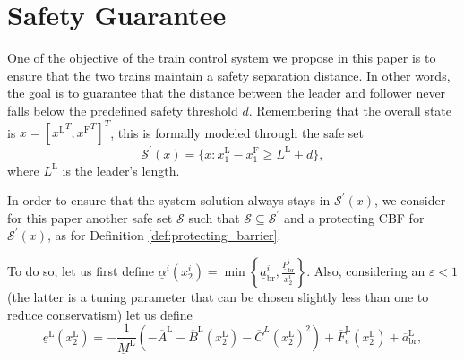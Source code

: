 \documentclass[letterpaper, 10 pt, conference]{ieeeconf}
\newcounter{Definition}
\theoremstyle{definition}
\newtheorem{definition}{Definition}
\theoremstyle{nopoint}
\begin{document}
  

  
  
 \section{Safety Guarantee}
 \label{sec:SafetyGuarantee}


\begin{comment}
	\begin{definition}[Braking Controller] \label{def:brakingController}
		Given the model present in \eqref{eq:dynamical_system_param_i} we define  $u^i(t)= K_\mathrm{B}(x^i(t))$ the braking controller as follows
		\begin{equation*}
			K_\mathrm{B}(x^i(t))=
			\begin{cases}
				\tilde{u}^i(x^i(t)) \leq 0 \qquad \mathit{if}\;  x_2^i(t) \geq 0\\
				0 \qquad\qquad\qquad \mathit{if}\;  x_2^i(t) = 0.
			\end{cases}     
		\end{equation*}
	\end{definition}
\end{comment}




One of the objective of the train control system we propose in this paper is to ensure that the two trains maintain a safety separation distance. In other words, the goal is to guarantee that the distance between the leader and follower never falls below the predefined safety threshold $d$. Remembering that the overall state is $x=[{x^\mathrm{L}}^T,{x^\mathrm{F}}^T]^T$, this is formally modeled through the safe set
%
\begin{equation} \label{eq:distance}
\mathcal{S}^\prime(x)=\{x: x_1^\mathrm{L}- x_1^\mathrm{F} \geq  L^\mathrm{L} +d\},
\end{equation}
where $L^\mathrm{L}$ is the leader's length. 

In order to ensure that the system solution always stays in $\mathcal{S}^\prime(x)$, we consider for this paper another safe set $\mathcal{S}$ such that $\mathcal{S}\subseteq \mathcal{S}^\prime$ and a protecting CBF for $\mathcal{S}^\prime(x)$, as for Definition \ref{def:protecting_barrier}. 


To do so, let us first define $\underline{\alpha}^i \left( x_2^i\right)=\min \left\{\underline{a}^i_\mathrm{br},\frac{\underline{P}^i_\mathrm{br}}{x_2^i} \right\}$. Also, considering an $\varepsilon<1$ (the latter is a tuning parameter that can be chosen slightly less than one to reduce conservatism) let us define  
\begin{equation*}
\underline{e}^\mathrm{L}\left(x_2^\mathrm{L}\right)=-\frac{1}{\underline{M}^\mathrm{L}}  \left(-\overline{A}^\mathrm{L}-\overline{B}^\mathrm{L} (x_2^\mathrm{L})- \overline{C}^{L}\left(x_2^\mathrm{L}\right)^2\right)+ \overline{F}_e^\mathrm{L}(x_2^\mathrm{L})+\overline{a}^\mathrm{L}_\mathrm{br}, 
\end{equation*}
\end{document}

